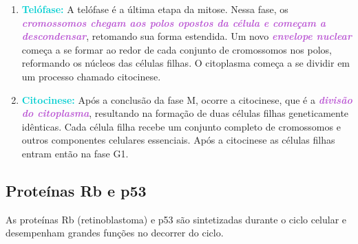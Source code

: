 \documentclass[11pt,a4paper]{article}
\begin{document}
\begin{enumerate}
		\item \textcolor{DarkTurquoise}{\textbf{Telófase:}}  A telófase é a última etapa da mitose. Nessa fase, os \textcolor{MediumOrchid}{\textbf{\textit{cromossomos chegam aos polos opostos da célula e começam a descondensar}}}, retomando sua forma estendida. Um novo \textcolor{MediumOrchid}{\textbf{\textit{envelope nuclear}}} começa a se formar ao redor de cada conjunto de cromossomos nos polos, reformando os núcleos das células filhas. O citoplasma começa a se dividir em um processo chamado citocinese.
		\item \textcolor{DarkTurquoise}{\textbf{Citocinese:}} Após a conclusão da fase M, ocorre a citocinese, que é a \textcolor{MediumOrchid}{\textbf{\textit{divisão do citoplasma}}}, resultando na formação de duas células filhas geneticamente idênticas. Cada célula filha recebe um conjunto completo de cromossomos e outros componentes celulares essenciais. Após a citocinese as células filhas entram então na fase G1.
	\end{enumerate}

\subsection*{Proteínas Rb e p53}

	As proteínas Rb (retinoblastoma) e p53 são sintetizadas durante o ciclo celular e desempenham grandes funções no decorrer do ciclo.
\end{document}
